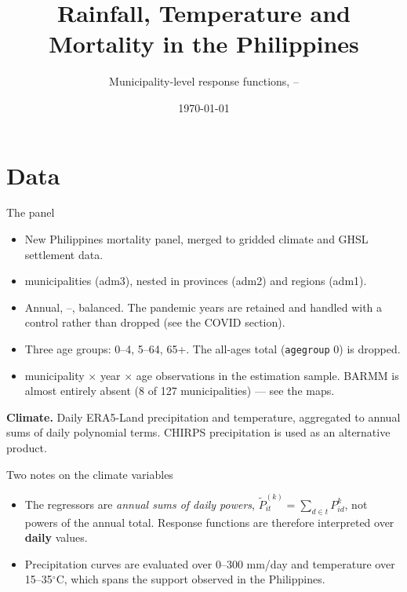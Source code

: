 \documentclass[10pt, aspectratio=169]{beamer}
\title{Rainfall, Temperature and Mortality in the Philippines}
\subtitle{Municipality-level response functions, \phlYearMin--\phlYearMax}
\date{\today}
\begin{document}
\begin{frame}[plain]
  \titlepage
\end{frame}

\section{Data}

\begin{frame}{The panel}
  \begin{itemize}
    \item New Philippines mortality panel, merged to gridded climate and
          GHSL settlement data.
    \item \textbf{\phlNadmthree} municipalities (adm3), nested in
          \textbf{\phlNadmtwo} provinces (adm2) and \textbf{\phlNadmone}
          regions (adm1).
    \item Annual, \phlYearMin--\phlYearMax, balanced. The pandemic years are
          retained and handled with a control rather than dropped (see the
          COVID section).
    \item Three age groups: 0--4, 5--64, 65+. The all-ages total
          (\texttt{agegroup} 0) is dropped.
    \item \textbf{\phlNobs} municipality $\times$ year $\times$ age
          observations in the estimation sample. BARMM is almost entirely
          absent (8 of 127 municipalities) --- see the maps.
  \end{itemize}

  \vspace{0.5em}
  \textbf{Climate.} Daily ERA5-Land precipitation and temperature, aggregated
  to annual sums of daily polynomial terms. CHIRPS precipitation is used as an
  alternative product.
\end{frame}

\begin{frame}{Two notes on the climate variables}
  \begin{itemize}
    \item The regressors are \emph{annual sums of daily powers},
          $\widetilde{P}^{(k)}_{it} = \sum_{d \in t} P_{id}^{k}$, not powers of
          the annual total. Response functions are therefore interpreted over
          \textbf{daily} values.
    \item Precipitation curves are evaluated over 0--300 mm/day and
          temperature over 15--35$^\circ$C, which spans the support observed in
          the Philippines.
  \end{itemize}
\end{frame}
\end{document}
